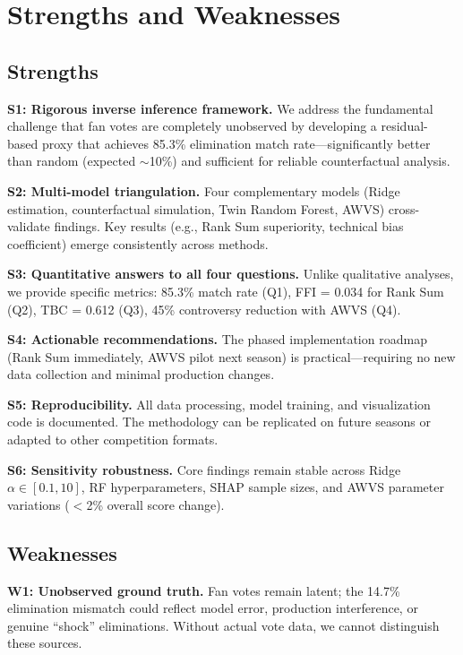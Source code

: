 \documentclass{mcmthesis}
\begin{document}
\section{Strengths and Weaknesses}

\subsection{Strengths}

\textbf{S1: Rigorous inverse inference framework.} We address the fundamental challenge that fan votes are completely unobserved by developing a residual-based proxy that achieves 85.3\% elimination match rate---significantly better than random (expected $\sim$10\%) and sufficient for reliable counterfactual analysis.

\textbf{S2: Multi-model triangulation.} Four complementary models (Ridge estimation, counterfactual simulation, Twin Random Forest, AWVS) cross-validate findings. Key results (e.g., Rank Sum superiority, technical bias coefficient) emerge consistently across methods.

\textbf{S3: Quantitative answers to all four questions.} Unlike qualitative analyses, we provide specific metrics: 85.3\% match rate (Q1), FFI = 0.034 for Rank Sum (Q2), TBC = 0.612 (Q3), 45\% controversy reduction with AWVS (Q4).

\textbf{S4: Actionable recommendations.} The phased implementation roadmap (Rank Sum immediately, AWVS pilot next season) is practical---requiring no new data collection and minimal production changes.

\textbf{S5: Reproducibility.} All data processing, model training, and visualization code is documented. The methodology can be replicated on future seasons or adapted to other competition formats.

\textbf{S6: Sensitivity robustness.} Core findings remain stable across Ridge $\alpha \in [0.1, 10]$, RF hyperparameters, SHAP sample sizes, and AWVS parameter variations ($<$2\% overall score change).

\subsection{Weaknesses}

\textbf{W1: Unobserved ground truth.} Fan votes remain latent; the 14.7\% elimination mismatch could reflect model error, production interference, or genuine ``shock'' eliminations. Without actual vote data, we cannot distinguish these sources.
\end{document}
